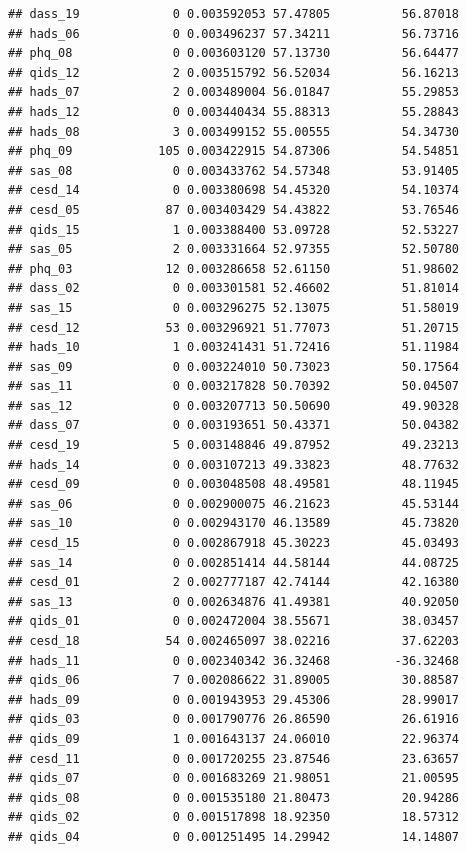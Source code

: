 \documentclass[
]{article}
\begin{document}
\begin{verbatim}
## dass_19             0 0.003592053 57.47805          56.87018
## hads_06             0 0.003496237 57.34211          56.73716
## phq_08              0 0.003603120 57.13730          56.64477
## qids_12             2 0.003515792 56.52034          56.16213
## hads_07             2 0.003489004 56.01847          55.29853
## hads_12             0 0.003440434 55.88313          55.28843
## hads_08             3 0.003499152 55.00555          54.34730
## phq_09            105 0.003422915 54.87306          54.54851
## sas_08              0 0.003433762 54.57348          53.91405
## cesd_14             0 0.003380698 54.45320          54.10374
## cesd_05            87 0.003403429 54.43822          53.76546
## qids_15             1 0.003388400 53.09728          52.53227
## sas_05              2 0.003331664 52.97355          52.50780
## phq_03             12 0.003286658 52.61150          51.98602
## dass_02             0 0.003301581 52.46602          51.81014
## sas_15              0 0.003296275 52.13075          51.58019
## cesd_12            53 0.003296921 51.77073          51.20715
## hads_10             1 0.003241431 51.72416          51.11984
## sas_09              0 0.003224010 50.73023          50.17564
## sas_11              0 0.003217828 50.70392          50.04507
## sas_12              0 0.003207713 50.50690          49.90328
## dass_07             0 0.003193651 50.43371          50.04382
## cesd_19             5 0.003148846 49.87952          49.23213
## hads_14             0 0.003107213 49.33823          48.77632
## cesd_09             0 0.003048508 48.49581          48.11945
## sas_06              0 0.002900075 46.21623          45.53144
## sas_10              0 0.002943170 46.13589          45.73820
## cesd_15             0 0.002867918 45.30223          45.03493
## sas_14              0 0.002851414 44.58144          44.08725
## cesd_01             2 0.002777187 42.74144          42.16380
## sas_13              0 0.002634876 41.49381          40.92050
## qids_01             0 0.002472004 38.55671          38.03457
## cesd_18            54 0.002465097 38.02216          37.62203
## hads_11             0 0.002340342 36.32468         -36.32468
## qids_06             7 0.002086622 31.89005          30.88587
## hads_09             0 0.001943953 29.45306          28.99017
## qids_03             0 0.001790776 26.86590          26.61916
## qids_09             1 0.001643137 24.06010          22.96374
## cesd_11             0 0.001720255 23.87546          23.63657
## qids_07             0 0.001683269 21.98051          21.00595
## qids_08             0 0.001535180 21.80473          20.94286
## qids_02             0 0.001517898 18.92350          18.57312
## qids_04             0 0.001251495 14.29942          14.14807
\end{verbatim}
\end{document}
